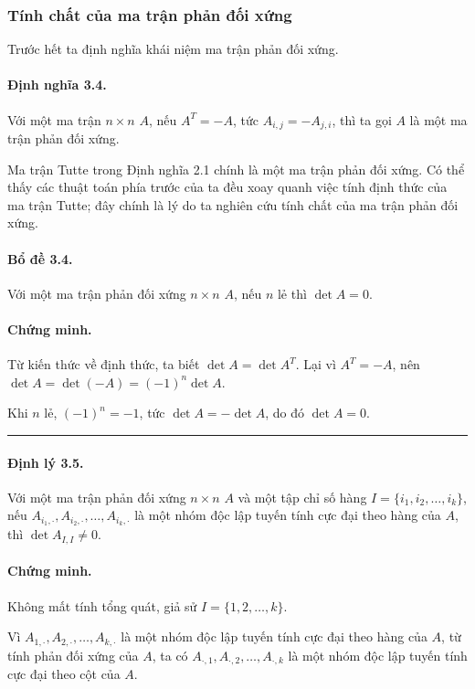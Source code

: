 \documentclass[11pt]{article}
\newcommand{\qedmark}{\hfill\rule{0.7ex}{0.7ex}}
\begin{document}
\subsubsection{Tính chất của ma trận phản đối xứng}

Trước hết ta định nghĩa khái niệm ma trận phản đối xứng.

\paragraph{Định nghĩa 3.4.}
Với một ma trận \(n\times n\) \(A\), nếu \(A^T=-A\), tức
\(A_{i,j}=-A_{j,i}\), thì ta gọi \(A\) là một ma trận phản đối xứng.

Ma trận Tutte trong Định nghĩa 2.1 chính là một ma trận phản đối xứng. Có thể
thấy các thuật toán phía trước của ta đều xoay quanh việc tính định thức của
ma trận Tutte; đây chính là lý do ta nghiên cứu tính chất của ma trận phản đối
xứng.

\paragraph{Bổ đề 3.4.}
Với một ma trận phản đối xứng \(n\times n\) \(A\), nếu \(n\) lẻ thì
\(\det A=0\).

\paragraph{Chứng minh.}
Từ kiến thức về định thức, ta biết \(\det A=\det A^T\). Lại vì \(A^T=-A\), nên
\(\det A=\det(-A)=(-1)^n\det A\).

Khi \(n\) lẻ, \((-1)^n=-1\), tức \(\det A=-\det A\), do đó \(\det A=0\).
\qedmark

\paragraph{Định lý 3.5.}
Với một ma trận phản đối xứng \(n\times n\) \(A\) và một tập chỉ số hàng
\(I=\{i_1,i_2,\ldots,i_k\}\), nếu
\(A_{i_1,\cdot},A_{i_2,\cdot},\ldots,A_{i_k,\cdot}\) là một nhóm độc lập tuyến
tính cực đại theo hàng của \(A\), thì \(\det A_{I,I}\ne 0\).

\paragraph{Chứng minh.}
Không mất tính tổng quát, giả sử \(I=\{1,2,\ldots,k\}\).

Vì \(A_{1,\cdot},A_{2,\cdot},\ldots,A_{k,\cdot}\) là một nhóm độc lập tuyến
tính cực đại theo hàng của \(A\), từ tính phản đối xứng của \(A\), ta có
\(A_{\cdot,1},A_{\cdot,2},\ldots,A_{\cdot,k}\) là một nhóm độc lập tuyến tính
cực đại theo cột của \(A\).
\end{document}
